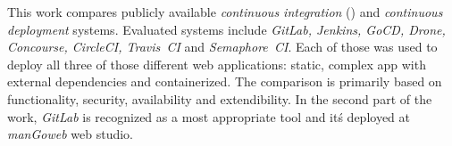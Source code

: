 This work compares publicly available \textit{continuous integration} (\CI) and \textit{continuous deployment} systems. Evaluated systems include \textit{GitLab, Jenkins, GoCD, Drone, Concourse, CircleCI, Travis~CI} and \textit{Semaphore~CI}. Each of those was used to deploy all three of those different web applications: static, complex app with external dependencies and containerized. The comparison is primarily based on functionality, security, availability and extendibility. In the second part of the work, \textit{GitLab} is recognized as a most appropriate tool and it\'s deployed at \textit{manGoweb} web studio.

